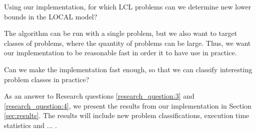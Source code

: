 \begin{researchquestion} \label{research_question:3}
Using our implementation, for which LCL problems can we determine new lower bounds in the LOCAL model?
\end{researchquestion}

The algorithm can be run with a single problem, but we also want to target classes of problems, where the quantity of problems can be large.
Thus, we want our implementation to be reasonable fast in order it to have use in practice.

\begin{researchquestion} \label{research_question:4}
Can we make the implementation fast enough, so that we can classify interesting problem classes in practice?
\end{researchquestion}

As an answer to Research questions \ref{research_question:3} and \ref{research_question:4}, we present the results from our implementation in Section \ref{sec:results}.
The results will include new problem classifications, execution time statistics and ... \todo{}.
